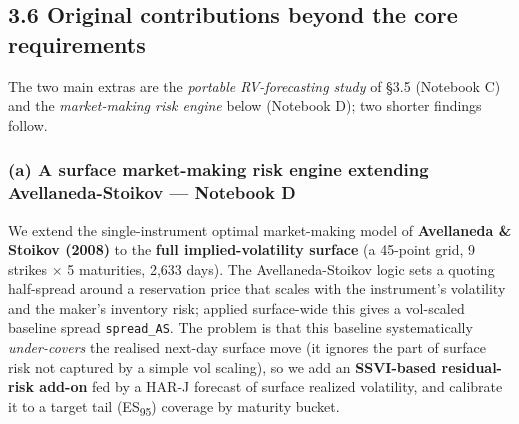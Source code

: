 \documentclass[10pt,a4paper]{article}
\begin{document}
\subsection*{3.6 Original contributions beyond the core requirements}

The two main extras are the \textit{portable RV-forecasting study} of \S{}3.5 (Notebook C) and the \textit{market-making risk engine} below (Notebook D); two shorter findings follow.

\subsubsection*{(a) A surface market-making risk engine extending Avellaneda-Stoikov --- Notebook D}

We extend the single-instrument optimal market-making model of \textbf{Avellaneda \& Stoikov (2008)} to the \textbf{full implied-volatility surface} (a 45-point grid, 9 strikes $\times$ 5 maturities, 2,633 days). The Avellaneda-Stoikov logic sets a quoting half-spread around a reservation price that scales with the instrument's volatility and the maker's inventory risk; applied surface-wide this gives a vol-scaled baseline spread \texttt{spread\_AS}. The problem is that this baseline systematically \textit{under-covers} the realised next-day surface move (it ignores the part of surface risk not captured by a simple vol scaling), so we add an \textbf{SSVI-based residual-risk add-on} fed by a HAR-J forecast of surface realized volatility, and calibrate it to a target tail (ES\textsubscript{95}) coverage by maturity bucket.
\end{document}
